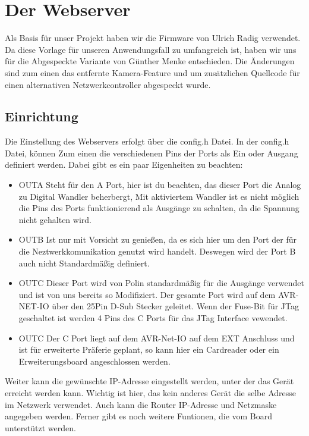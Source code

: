 \chapter{Der Webserver}

Als Basis für unser Projekt haben wir die Firmware von Ulrich Radig verwendet.
Da diese Vorlage für unseren Anwendungsfall zu umfangreich ist,  haben wir uns 
für die Abgespeckte Variante von Günther Menke entschieden. Die Änderungen sind
zum einen das entfernte Kamera-Feature und um zusätzlichen Quellcode für einen
alternativen Netzwerkcontroller abgespeckt wurde.

\section{Einrichtung}

Die Einstellung des Webservers erfolgt über die \textrm{config.h} Datei. In der
\textrm{config.h} Datei, können Zum einen die verschiedenen Pins der Ports als Ein oder
Ausgang definiert werden. Dabei gibt es ein paar Eigenheiten zu beachten:
\begin{itemize}
  \item OUTA Steht für den A Port, hier ist du beachten, das dieser Port die
  Analog zu Digital Wandler beherbergt, Mit aktiviertem Wandler ist es nicht
  möglich die Pins des Ports funktionierend als Ausgänge zu schalten, da die
  Spannung nicht gehalten wird.
  \item OUTB Ist nur mit Vorsicht zu genießen, da es sich hier um den Port der
  für die Neztwerkkomunikation genutzt wird handelt. Deswegen wird der Port B
  auch nicht Standardmäßig definiert.
  \item OUTC Dieser Port wird von Polin standardmäßig für die Ausgänge verwendet
  und ist von uns bereits so Modifiziert. Der gesamte Port wird auf dem
  AVR-NET-IO über den 25Pin D-Sub Stecker geleitet. Wenn der Fuse-Bit für JTag
  geschaltet ist werden 4 Pins des C Ports für das JTag Interface vewendet.
  \item OUTC Der C Port liegt auf dem AVR-Net-IO auf dem EXT Anschluss und ist
  für erweiterte Präferie geplant, so kann hier ein Cardreader oder ein
  Erweiterungsboard angeschlossen werden.
\end{itemize}
Weiter kann die gewünschte IP-Adresse eingestellt werden, unter der das Gerät
erreicht werden kann. Wichtig ist hier, das kein anderes Gerät die selbe Adresse
im Netzwerk verwendet. Auch kann die Router IP-Adresse und Netzmaske angegeben
werden. Ferner gibt es noch weitere Funtionen, die vom Board unterstützt werden.
